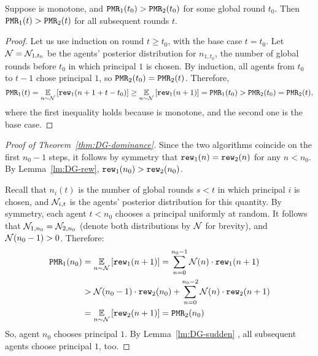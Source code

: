 \begin{lemma}\label{lm:DG-sudden}
Suppose \alg[1] is monotone, and $\mathtt{PMR}_1(t_0)>\mathtt{PMR}_2(t_0)$ for some global round $t_0$. Then $\mathtt{PMR}_1(t)>\mathtt{PMR}_2(t)$ for all subsequent rounds $t$.
\end{lemma}

\begin{proof}
Let us use induction on round $t\geq t_0$, with the base case $t=t_0$. Let $\mathcal{N}=\mathcal{N}_{1,t_0}$ be the agents' posterior distribution for $n_{1,t_0}$, the number of global rounds before $t_0$ in which principal $1$ is chosen. By induction, all agents from $t_0$ to $t-1$ chose principal $1$, so $\mathtt{PMR}_2(t_0)= \mathtt{PMR}_2(t)$. Therefore,
\[ \mathtt{PMR}_1(t)
    = \operatorname*{\mathbb{E}}_{n\sim \mathcal{N}}\left[\mathtt{rew}_1(n+1+t-t_0)\right]
    \geq \operatorname*{\mathbb{E}}_{n\sim \mathcal{N}}\left[\mathtt{rew}_1(n+1)\right]
    =\mathtt{PMR}_1(t_0) > \mathtt{PMR}_2(t_0)= \mathtt{PMR}_2(t), \]
where the first inequality holds because \alg[1] is monotone, and the second one is the base case.
\end{proof}

\begin{proof}[Proof of Theorem~\ref{thm:DG-dominance}]
Since the two algorithms coincide on the first $n_0-1$ steps, it follows by symmetry that $\mathtt{rew}_1(n) = \mathtt{rew}_2(n)$ for any $n< n_0$.
By Lemma~\ref{lm:DG-rew},
    $\mathtt{rew}_1(n_0) > \mathtt{rew}_2(n_0)$.

Recall that $n_i(t)$ is the number of global rounds $s<t$ in which principal $i$ is chosen, and $\mathcal{N}_{i,t}$ is the agents' posterior distribution for this quantity. By symmetry, each agent $t<n_0$ chooses a principal uniformly at random. It follows that
    $\mathcal{N}_{1,n_0} = \mathcal{N}_{2,n_0}$
(denote both distributions by $\mathcal{N}$ for brevity), and $\mathcal{N}(n_0-1)>0$.
Therefore:
\begin{align}
\PMR_1(n_0)
  &= \Ex{n\sim \mN} {\rew_1(n+ 1)}
   = \sum_{n = 0}^{n_0-1} \mN(n) \cdot{\rew_1(n + 1)} \nonumber \\
  & > \mN(n_0-1)\cdot {\rew_2(n_0)} + \sum_{n = 0}^{n_0-2}  \mN(n)\cdot{\rew_2(n + 1)}
    \nonumber \\
  &= \Ex{n\sim \mN}{\rew_2(n + 1)} = \PMR_2(n_0) \label{eq:pf:thm:DG-dominance}
\end{align}
So, agent $n_0$ chooses principal $1$. By Lemma~\ref{lm:DG-sudden} , all subsequent agents choose principal $1$, too.
\end{proof}


